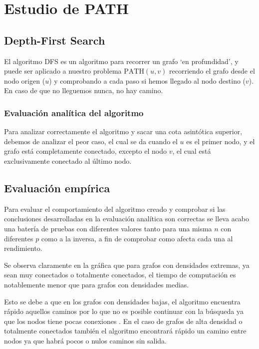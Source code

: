 \section{Estudio de PATH}\label{sec:path}


\subsection{Depth-First Search}\label{subsec:dfs}
El algoritmo DFS\supercite{hopcroft1983data} es un algoritmo para recorrer un grafo `en profundidad', y puede ser aplicado a nuestro problema $\mathrm{PATH}(u,v)$ recorriendo el grafo desde el nodo origen ($u$) y comprobando a cada paso si hemos llegado al nodo destino ($v$). En caso de que no lleguemos nunca, no hay camino.

\subsubsection*{Evaluación analítica del algoritmo}
Para analizar correctamente el algoritmo y sacar una cota asintótica superior, debemos de analizar el peor caso, %
el cual se da cuando el $u$ es el primer nodo, y el grafo está completamente conectado, excepto el nodo $v$, el cual está exclusivamente conectado al último nodo.



\subsection*{Evaluación empírica}

Para evaluar el comportamiento del algoritmo creado y comprobar si las conclusiones desarrolladas en la evaluación analítica son correctas se lleva acabo una batería de pruebas con diferentes valores tanto para una misma $n$ con diferentes $p$ como a la inversa, a fin de comprobar como afecta cada una al rendimiento.


Se observa claramente en la gráfica que para grafos con densidades extremas, ya sean muy conectados o totalmente conectados, el tiempo de computación es notablemente menor que para grafos con densidades medias.

Esto se debe a que en los grafos con densidades bajas, el algoritmo encuentra rápido aquellos caminos por lo que no es posible continuar con la búsqueda ya que los nodos tiene pocas conexiones . En el caso de grafos de alta densidad o totalmente conectados también el algoritmo encontrará rápido un camino entre nodos ya que habrá pocos o nulos caminos sin salida.

